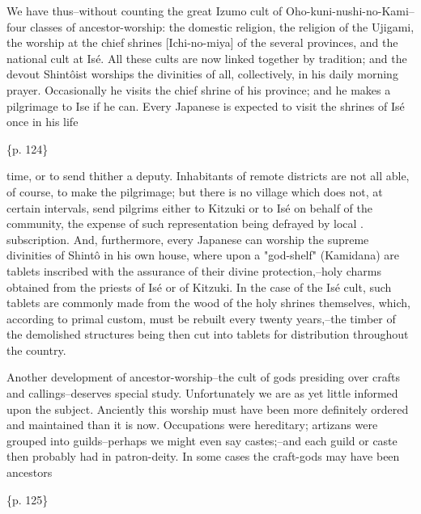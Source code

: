 We have thus--without counting the great Izumo cult of Oho-kuni-nushi-no-Kami--four classes of ancestor-worship: the domestic religion, the religion of the Ujigami, the worship at the chief shrines [Ichi-no-miya] of the several provinces, and the national cult at Isé. All these cults are now linked together by tradition; and the devout Shintôist worships the divinities of all, collectively, in his daily morning prayer. Occasionally he visits the chief shrine of his province; and he makes a pilgrimage to Ise if he can. Every Japanese is expected to visit the shrines of Isé once in his life

\{p. 124\}

time, or to send thither a deputy. Inhabitants of remote districts are not all able, of course, to make the pilgrimage; but there is no village which does not, at certain intervals, send pilgrims either to Kitzuki or to Isé on behalf of the community, the expense of such representation being defrayed by local . subscription. And, furthermore, every Japanese can worship the supreme divinities of Shintô in his own house, where upon a "god-shelf" (Kamidana) are tablets inscribed with the assurance of their divine protection,--holy charms obtained from the priests of Isé or of Kitzuki. In the case of the Isé cult, such tablets are commonly made from the wood of the holy shrines themselves, which, according to primal custom, must be rebuilt every twenty years,--the timber of the demolished structures being then cut into tablets for distribution throughout the country.



Another development of ancestor-worship--the cult of gods presiding over crafts and callings--deserves special study. Unfortunately we are as yet little informed upon the subject. Anciently this worship must have been more definitely ordered and maintained than it is now. Occupations were hereditary; artizans were grouped into guilds--perhaps we might even say castes;--and each guild or caste then probably had in patron-deity. In some cases the craft-gods may have been ancestors

\{p. 125\}

